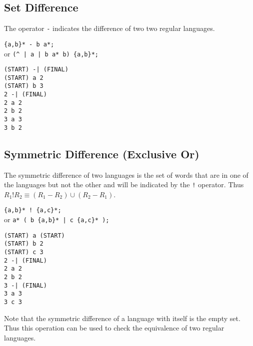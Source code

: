 \subsection{Set Difference}
The operator \verb#-# indicates the difference of two two regular
languages.
\begin{center}\begin{minipage}[t]{3in}\begin{minipage}[t]{3in}\begin{tabbing}
\qquad \= \verb#{a,b}* - b a*;#\\
or \> \verb#(^ | a | b a* b) {a,b}*;#
\end{tabbing}\end{minipage}\end{minipage}
\begin{minipage}[t]{1.6in}\begin{verbatim}
(START) -| (FINAL)
(START) a 2
(START) b 3
2 -| (FINAL)
2 a 2
2 b 2
3 a 3
3 b 2
\end{verbatim}\end{minipage}\end{center}

\subsection{Symmetric Difference (Exclusive Or)}
The symmetric difference of two languages is the set of words that are in
one of the languages but not the other and will be indicated by the
\verb#!# operator.
Thus $R_1 ! R_2 \equiv (R_1-R_2) \cup (R_2-R_1)$.
\begin{center}\begin{minipage}[t]{3in}\begin{minipage}[t]{3in}\begin{tabbing}
\qquad \= \verb#{a,b}* ! {a,c}*;#\\
or \> \verb#a* ( b {a,b}* | c {a,c}* );#
\end{tabbing}\end{minipage}\end{minipage}
\begin{minipage}[t]{1.6in}\begin{verbatim}
(START) a (START)
(START) b 2
(START) c 3
2 -| (FINAL)
2 a 2
2 b 2
3 -| (FINAL)
3 a 3
3 c 3
\end{verbatim}\end{minipage}\end{center}
Note that the symmetric difference of a language with itself is the empty
set.
Thus this operation can be used to check the equivalence of two regular
languages.

